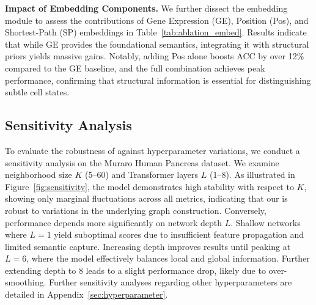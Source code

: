 \smallskip\noindent\textbf{Impact of Embedding Components.} We further dissect the embedding module to assess the contributions of Gene Expression (GE), Position (Pos), and Shortest-Path (SP) embeddings in Table~\ref{tab:ablation_embed}. Results indicate that while GE provides the foundational semantics, integrating it with structural priors yields massive gains. Notably, adding Pos alone boosts ACC by over 12\% compared to the GE baseline, and the full combination achieves peak performance, confirming that structural information is essential for distinguishing subtle cell states.


\subsection{Sensitivity Analysis}
To evaluate the robustness of \method{} against hyperparameter variations, we conduct a sensitivity analysis on the Muraro Human Pancreas dataset. We examine neighborhood size $K$ (5--60) and Transformer layers $L$ (1--8). As illustrated in Figure~\ref{fig:sensitivity}, the model demonstrates high stability with respect to $K$, showing only marginal fluctuations across all metrics, indicating that our \method{} is robust to variations in the underlying graph construction. Conversely, performance depends more significantly on network depth $L$. Shallow networks where $L=1$ yield suboptimal scores due to insufficient feature propagation and limited semantic capture. Increasing depth improves results until peaking at $L=6$, where the model effectively balances local and global information. Further extending depth to 8 leads to a slight performance drop, likely due to over-smoothing. Further sensitivity analyses regarding other hyperparameters are detailed in Appendix~\ref{sec:hyperparameter}.